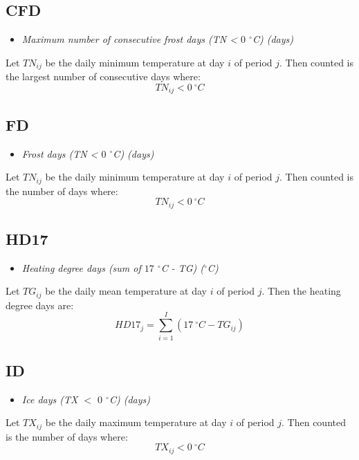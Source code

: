 \documentclass[a4paper,11pt]{article}
\begin{document}
\subsection*{CFD}
\begin{itemize}
\item \textit{Maximum number of consecutive frost days (TN < $0$
$^\circ$C) (days)}
\end{itemize}
Let $TN_{ij}$ be the daily minimum temperature at day $i$ of period
$j$. Then counted is the largest number of consecutive days where:
\begin{equation*}
TN_{ij} < 0 \:^\circ C
\end{equation*}

\subsection*{FD}
\begin{itemize}
\item \textit{Frost days (TN < $0$ $^\circ$C) (days)}
\end{itemize}
Let $TN_{ij}$ be the daily minimum temperature at day $i$ of period
$j$. Then counted is the number of days where:
\begin{equation*}
TN_{ij} < 0 \:^\circ C
\end{equation*}

\subsection*{HD17}
\begin{itemize}
\item \textit{Heating degree days (sum of $17$ $^\circ$C - TG)
($^\circ$C)}
\end{itemize}
Let $TG_{ij}$ be the daily mean temperature at day $i$ of period
$j$. Then the heating degree days are:
\begin{equation*}
HD17_{j} = \sum_{i=1}^{I}(17 \:^\circ C - TG_{ij})
\end{equation*}

\subsection*{ID}
\begin{itemize}
\item \textit{Ice days (TX $<$ $0$ $^\circ$C) (days)}
\end{itemize}
Let $TX_{ij}$ be the daily maximum temperature at day $i$ of period
$j$. Then counted is the number of days where:
\begin{equation*}
TX_{ij} < 0\: ^\circ C
\end{equation*}
\end{document}
